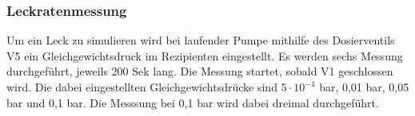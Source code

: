 \subsubsection{Leckratenmessung}
Um ein Leck zu simulieren wird bei laufender Pumpe mithilfe des Dosierventils V5 ein Gleichgewichtsdruck im Rezipienten eingestellt.
Es werden sechs Messung durchgeführt, jeweils 200 Sek lang. Die Messung startet, sobald V1 geschlossen wird. Die dabei eingestellten 
Gleichgewichtsdrücke sind $5\cdot 10^{-4}$ bar, 0,01 bar, 0,05 bar und 0,1 bar. Die Messsung bei 0,1 bar wird dabei dreimal durchgeführt.


